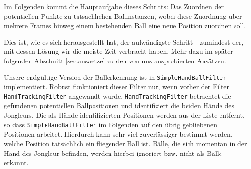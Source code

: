 \documentclass[12pt,a4paper,ngerman]{scrartcl}
\begin{document}

Im Folgenden kommt die Hauptaufgabe dieses Schritts: Das Zuordnen der potentiellen
Punkte zu tatsächlichen Ballinstanzen, wobei diese Zuordnung über mehrere Frames
hinweg einem bestehenden Ball eine neue Position zuordnen soll.

Dies ist, wie es sich herausgestellt hat, der aufwändigste Schritt - zumindest der, mit dessen Lösung wir die meiste Zeit verbracht haben. Mehr dazu im später folgenden Abschnitt \ref{sec:ansaetze} zu den von uns ausprobierten Ansätzen.

Unsere endgültige Version der Ballerkennung ist in \lstinline{SimpleHandBallFilter}
implementiert. Robust funktioniert dieser Filter nur, wenn vorher der Filter
\lstinline{HandTrackingFilter} angewandt wurde. \lstinline{HandTrackingFilter}  betrachtet die gefundenen potentiellen Ballpositionen und identifiziert die beiden Hände des Jongleurs. Die als Hände identifizierten Positionen werden aus der Liste entfernt, so dass \lstinline{SimpleHandBallFilter} im Folgenden auf den übrig gebliebenen Positionen arbeitet. Hierdurch kann sehr viel zuverlässiger bestimmt werden, welche Position tatsächlich ein fliegender Ball ist. Bälle, die sich momentan in der Hand des Jongleur befinden, werden hierbei ignoriert bzw. nicht als Bälle erkannt.
\end{document}
